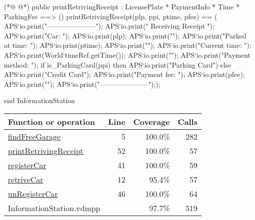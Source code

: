 \begin{vdmpp}[breaklines=true]
(*@
\label{printRetrivingReceipt:52}
@*)
public printRetrivingReceipt : LicensePlate * PaymentInfo * Time * ParkingFee ==> ()
printRetrivingReceipt(plp, ppi, ptime, pfee) == (
  APS`io.print("---------------------\n"); 
  APS`io.print("  Receiving Receipt  \n"); 
  APS`io.print("Car: "); APS`io.print(plp); APS`io.print("\n");
  APS`io.print("Parked at time: "); APS`io.print(ptime); APS`io.print("\n");
  APS`io.print("Current time: "); APS`io.print(World`timeRef.getTime()); APS`io.print("\n");
  APS`io.print("Payment method: ");
  if is_ParkingCard(ppi)
   then APS`io.print("Parking Card\n")
  else APS`io.print("Credit Card\n");
  APS`io.print("Payment fee: "); APS`io.print(pfee); APS`io.print("\n");
  APS`io.print("---------------------\n"););



end InformationStation
\end{vdmpp}
\bigskip
\begin{longtable}{|l|r|r|r|}
\hline
Function or operation & Line & Coverage & Calls \\
\hline
\hline
\hyperref[findFreeGarage:5]{findFreeGarage} & 5&100.0\% & 282 \\
\hline
\hyperref[printRetrivingReceipt:52]{printRetrivingReceipt} & 52&100.0\% & 57 \\
\hline
\hyperref[registerCar:41]{registerCar} & 41&100.0\% & 59 \\
\hline
\hyperref[retriveCar:12]{retriveCar} & 12&95.4\% & 57 \\
\hline
\hyperref[unRegisterCar:46]{unRegisterCar} & 46&100.0\% & 64 \\
\hline
\hline
InformationStation.vdmpp & & 97.7\% & 519 \\
\hline
\end{longtable}

